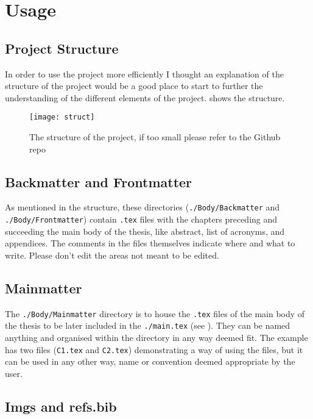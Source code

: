 \chapter{Usage}

\section{Project Structure}

In order to use the project more efficiently I thought an explanation of the structure of the project would be a good place to start to further the understanding of the different elements of the project.  shows the structure.

\begin{figure}
    \centering
    \texttt{[image: struct]}
    \caption{The structure of the project, if too small please refer to the Github repo\cite{github}}
    \label{fig:struct}
\end{figure}


\section{Backmatter and Frontmatter}

As mentioned in the structure, these directories (\texttt{./Body/Backmatter} and \texttt{./Body/Frontmatter}) contain \texttt{.tex} files with the chapters preceding and succeeding the main body of the thesis, like abstract, list of acronyms, and appendices. The comments in the files themselves indicate where and what to write. Please don't edit the areas not meant to be edited.

\section{Mainmatter}\label{sec:mainmatter}

The \texttt{./Body/Mainmatter} directory is to house the \texttt{.tex} files of the main body of the thesis to be later included in the \texttt{./main.tex} (see ). They can be named anything and organised within the directory in any way deemed fit. The example has two files (\texttt{C1.tex} and \texttt{C2.tex}) demonstrating a way of using the files, but it can be used in any other way, name or convention deemed appropriate by the user.

\section{Imgs and refs.bib}

